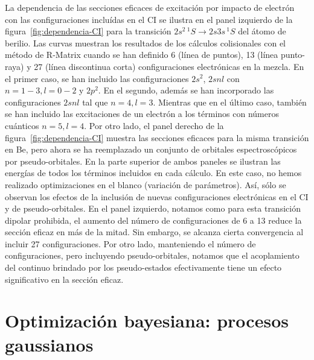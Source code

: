 La dependencia de las secciones eficaces de excitación por impacto de 
electrón con las configuraciones incluídas en el CI se ilustra en el 
panel izquierdo de la figura~\ref{fig:dependencia-CI} para la transición 
$2s^2\,^1S\rightarrow 2s3s\,^1S$ del átomo de berilio. Las curvas 
muestran los resultados de los cálculos colisionales con el método de 
R-Matrix cuando se han definido 6 (línea de puntos), 13 (línea 
punto-raya) y 27 (línea discontinua corta) configuraciones electrónicas 
en la mezcla. En el primer caso, se han incluido las configuraciones 
$2s^2$, $2snl$ con $n=1-3,l=0-2$ y $2p^2$. En el segundo, además se han 
incorporado las configuraciones $2snl$ tal que $n=4,l=3$. Mientras que en 
el último caso, también se han incluido las excitaciones de un electrón a 
los términos con números cuánticos $n=5,l=4$. Por otro lado, el panel 
derecho de la figura~\ref{fig:dependencia-CI} muestra las secciones 
eficaces para la misma transición en Be, pero ahora se ha reemplazado un 
conjunto de orbitales espectroscópicos por pseudo-orbitales. En la parte 
superior de ambos paneles se ilustran las energías de todos los términos 
incluidos en cada cálculo. En este caso, no hemos realizado 
optimizaciones en el blanco (variación de parámetros). Así, sólo se 
observan los efectos de la inclusión de nuevas configuraciones 
electrónicas en el CI y de pseudo-orbitales. En el panel izquierdo, 
notamos como para esta transición dipolar prohibida, el aumento del 
número de configuraciones de 6 a 13 reduce la sección eficaz en más de la 
mitad. Sin embargo, se alcanza cierta convergencia al incluir 27 
configuraciones. Por otro lado, manteniendo el número de configuraciones,
pero incluyendo pseudo-orbitales, notamos que el acoplamiento del 
continuo brindado por los pseudo-estados efectivamente tiene un efecto 
significativo en la sección eficaz.

\newpage
\section{Optimización bayesiana: procesos gaussianos}
\label{sec:gaussianprocess}

